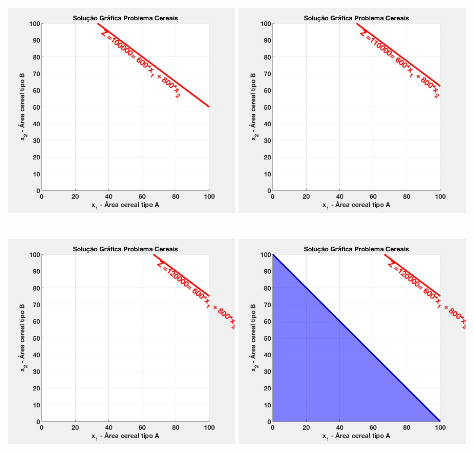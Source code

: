 \documentclass{beamer}
\begin{document}
\begin{frame}
\begin{columns}
\begin{column}{0.5\textwidth}
			\only<7> {\includegraphics[width=6cm,height=6cm]{MatLab/anima_7.png} }
			\only<8> {\includegraphics[width=6cm,height=6cm]{MatLab/anima_8.png} }
			\only<9-10> {\includegraphics[width=6cm,height=6cm]{MatLab/anima_9.png} }
			\only<11-12> {\includegraphics[width=6cm,height=6cm]{MatLab/anima_10.png} }

\end{column}
\end{columns}
\end{frame}
\end{document}
